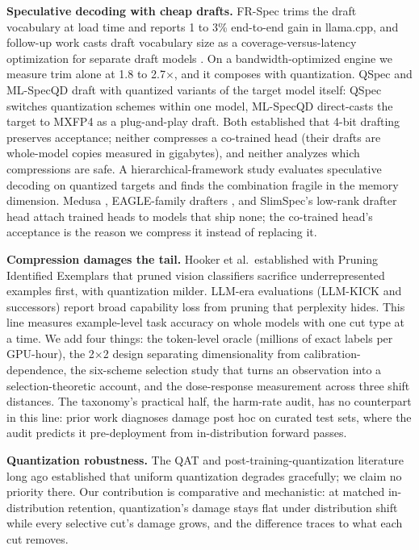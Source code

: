 \documentclass{article}
\newcommand{\x}{$\times$}
\begin{document}
\textbf{Speculative decoding with cheap drafts.} FR-Spec \cite{zhao2025frspec} trims the draft vocabulary at load time and reports 1 to 3\% end-to-end gain in llama.cpp, and follow-up work casts draft vocabulary size as a coverage-versus-latency optimization for separate draft models \cite{benshoham2026trimming}. On a bandwidth-optimized engine we measure trim alone at 1.8 to 2.7\x, and it composes with quantization. QSpec \cite{zhao2024qspec} and ML-SpecQD \cite{georganas2025mlspecqd} draft with quantized variants of the target model itself: QSpec switches quantization schemes within one model, ML-SpecQD direct-casts the target to MXFP4 as a plug-and-play draft. Both established that 4-bit drafting preserves acceptance; neither compresses a co-trained head (their drafts are whole-model copies measured in gigabytes), and neither analyzes which compressions are safe. A hierarchical-framework study \cite{zhang2025specquant} evaluates speculative decoding on quantized targets and finds the combination fragile in the memory dimension. Medusa \cite{cai2024medusa}, EAGLE-family drafters \cite{li2024eagle}, and SlimSpec's low-rank drafter head \cite{plaksin2026slimspec} attach trained heads to models that ship none; the co-trained head's acceptance is the reason we compress it instead of replacing it.

\textbf{Compression damages the tail.} Hooker et al.\ established with Pruning Identified Exemplars \cite{hooker2019compressed} that pruned vision classifiers sacrifice underrepresented examples first, with quantization milder. LLM-era evaluations (LLM-KICK \cite{jaiswal2024kick} and successors) report broad capability loss from pruning that perplexity hides. This line measures example-level task accuracy on whole models with one cut type at a time. We add four things: the token-level oracle (millions of exact labels per GPU-hour), the 2$\times$2 design separating dimensionality from calibration-dependence, the six-scheme selection study that turns an observation into a selection-theoretic account, and the dose-response measurement across three shift distances. The taxonomy's practical half, the harm-rate audit, has no counterpart in this line: prior work diagnoses damage post hoc on curated test sets, where the audit predicts it pre-deployment from in-distribution forward passes.

\textbf{Quantization robustness.} The QAT and post-training-quantization literature long ago established that uniform quantization degrades gracefully; we claim no priority there. Our contribution is comparative and mechanistic: at matched in-distribution retention, quantization's damage stays flat under distribution shift while every selective cut's damage grows, and the difference traces to what each cut removes.
\end{document}
